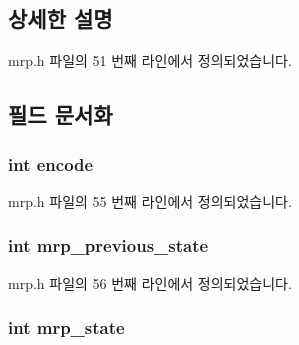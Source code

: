 \subsection{상세한 설명}


mrp.\+h 파일의 51 번째 라인에서 정의되었습니다.



\subsection{필드 문서화}
\subsubsection[{\texorpdfstring{encode}{encode}}]{\setlength{\rightskip}{0pt plus 5cm}int encode}\hypertarget{structmrp__applicant__attribute_a29558c1e60f974924d00ebfe5daa02d2}{}\label{structmrp__applicant__attribute_a29558c1e60f974924d00ebfe5daa02d2}


mrp.\+h 파일의 55 번째 라인에서 정의되었습니다.

\subsubsection[{\texorpdfstring{mrp\+\_\+previous\+\_\+state}{mrp_previous_state}}]{\setlength{\rightskip}{0pt plus 5cm}int mrp\+\_\+previous\+\_\+state}\hypertarget{structmrp__applicant__attribute_a36519f39fcb22bd3b6b05b51d2bb7fbf}{}\label{structmrp__applicant__attribute_a36519f39fcb22bd3b6b05b51d2bb7fbf}


mrp.\+h 파일의 56 번째 라인에서 정의되었습니다.

\subsubsection[{\texorpdfstring{mrp\+\_\+state}{mrp_state}}]{\setlength{\rightskip}{0pt plus 5cm}int mrp\+\_\+state}\hypertarget{structmrp__applicant__attribute_a81aba50506912ce81758c19f9859445e}{}\label{structmrp__applicant__attribute_a81aba50506912ce81758c19f9859445e}


